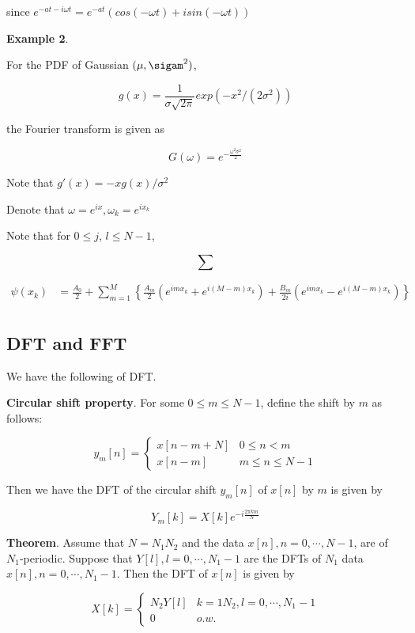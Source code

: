 \documentclass[12pt]{article}
\theoremstyle{nonumberbreak}
\begin{document}
since $e^{-at - i\omega t} = e^{-at} \left( cos(-\omega t) + i sin( - \omega t) \right) $ 



\textbf{Example 2}.

For the PDF of Gaussian $(\mu, \sigam^2)$,

$$
g(x) = \frac{1}{\sigma \sqrt{2\pi}} exp\left( -x^2/(2\sigma^2) \right)
$$

the Fourier transform is given as

$$
G(\omega) = e^{-\frac{\omega^2 \sigma^2}{2}}
$$

Note that $g'(x) = -xg(x)/\sigma^2$



Denote that $\omega = e^{ix}, \omega_k = e^{ix_k}$

Note that for $0 \le j$, $l \le N-1$, 

$$
\sum
$$


$$
\begin{aligned}
\psi(x_k) &= \frac{A_0}{2} + \sum_{m=1}^M \left\{ \frac{A_m}{2} \left( e^{imx_k} + e^{i(M-m)x_k} \right) + \frac{B_m}{2i} \left( e^{imx_k} - e^{i(M-m)x_k} \right) \right\} \\[8pt]
\end{aligned}
$$




\subsection*{DFT and FFT}


We have the following  of DFT. 



\begin{theorem}
\textbf{Circular shift property}. For some $0 \le m \le N-1$, define the shift by $m$ as follows:

$$
y_m[n] = \begin{cases} 
x[n-m+N] & 0 \le n < m \\
x[n-m] & m \le n \le N-1
\end{cases}
$$

Then we have the DFT of the circular shift $y_m[n]$ of $x[n]$ by $m$ is given by

$$
Y_m[k] = X[k] e^{-i \frac{2\pi km}{N}}
$$
\end{theorem}




\begin{theorem}
\textbf{Theorem}. Assume that $N=N_1N_2$ and the data $x[n], n=0,\cdots,N-1$, are of $N_1$-periodic. Suppose that $Y[l], l=0,\cdots,N_1-1$ are the DFTs of $N_1$ data $x[n], n=0,\cdots,N_1-1$. Then the DFT of $x[n]$ is given by

$$
X[k] = \begin{cases} 
N_2 Y[l] & k=1N_2, l=0,\cdots,N_1-1 \\
0 & o.w.
\end{cases}
$$
\end{theorem}
\end{document}
